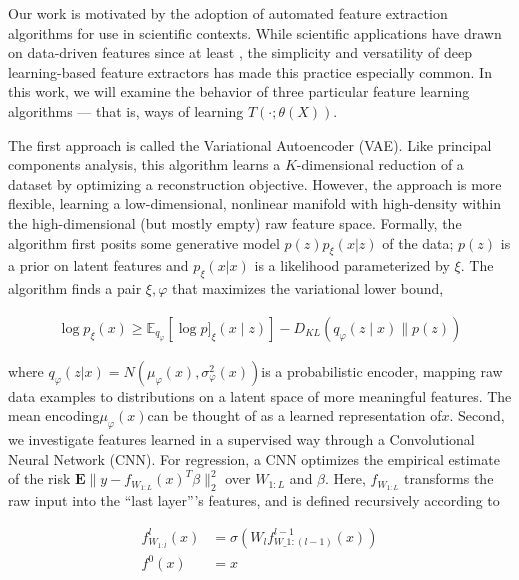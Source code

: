 Our work is motivated by the adoption of automated feature extraction algorithms for use in scientific contexts. While scientific applications have drawn on data-driven features since at least \cite{rao1964}, the simplicity and versatility of deep learning-based feature extractors has made this practice especially common.
In this work, we will examine the behavior of three particular feature learning algorithms — that is, ways of learning $T\left(\cdot; \theta\left(X\right)\right)$.

The first approach is called the Variational Autoencoder (VAE). Like principal components analysis, this algorithm learns a $K$-dimensional reduction of a dataset by optimizing a reconstruction objective. However, the approach is more flexible, learning a low-dimensional, nonlinear manifold with high-density within the high-dimensional (but mostly empty) raw feature space. Formally, the algorithm first posits some generative model $p\left(z\right)p_{\xi}\left(x \vert z\right)$ of the data; $p\left(z\right)$ is a prior on latent features and $p_{\xi}\left(x \vert x\right)$ is a likelihood parameterized by $\xi$. The algorithm finds a pair $\xi, \varphi$ that maximizes the variational lower bound,

\begin{align*}
\log p_{\xi}\left(x\right) \geq  \mathbb{E}_{q_{\varphi}}\left[\log p]_{\xi}(x \mid z)\right]-D_{KL}\left(q_{\varphi}(z \mid x) \| p(z)\right)
\end{align*}

where $q_{\varphi}\left(z \vert x\right) = N\left(\mu_{\varphi}\left(x\right), \sigma^{2}_{\varphi}\left(x\right)\right)$is a probabilistic encoder, mapping raw data examples to distributions on a latent space of more meaningful features. The mean encoding$\mu_{\varphi}\left(x\right)$can be thought of as a learned representation of$x$.
Second, we investigate features learned in a supervised way through a
Convolutional Neural Network (CNN). For regression, a CNN optimizes the
empirical estimate of the risk $\mathbf{E}\|y -
f_{W_{1:L}}\left(x\right)^{T}\beta\|_{2}^{2}$ over $W_{1:L}$ and $\beta$. Here,
$f_{W_{1:L}}$ transforms the raw input into the ``last layer''’s features, and
is defined recursively according to

\begin{align*}
f^{l}_{W_{1:l}}\left(x\right) &= \sigma\left(W_{l}f^{l - 1}_{W\_{1:(l - 1)}}\left(x\right)\right)\\
f^{0}\left(x\right) &= x
\end{align*}

